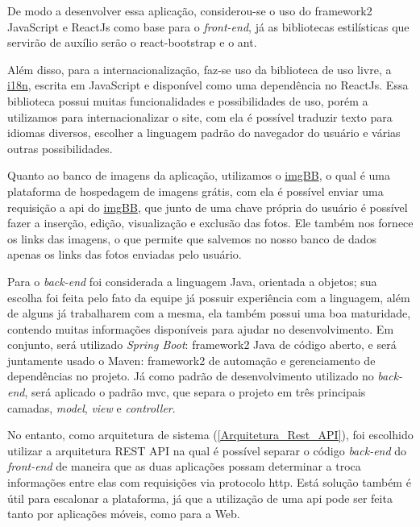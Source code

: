 De modo a desenvolver essa aplicação, considerou-se o uso do \gls{framework2} JavaScript e ReactJs como base para o \textsl{\gls{front-end}}, já as bibliotecas estilísticas que servirão de auxílio serão o \gls{react-bootstrap} e o \gls{ant}.

Além disso, para a internacionalização, faz-se uso da biblioteca de uso livre, a  \href{https://www.i18next.com}{i18n}, escrita em JavaScript e disponível como uma dependência no ReactJs. Essa biblioteca possui muitas funcionalidades e possibilidades de uso, porém a utilizamos para internacionalizar o site, com ela é possível traduzir texto para idiomas diversos, escolher a linguagem padrão do navegador do usuário e várias outras possibilidades.

Quanto ao banco de imagens da aplicação, utilizamos o \href{https://pt-br.imgbb.com}{imgBB}, o qual é uma plataforma de hospedagem de imagens grátis, com ela é possível enviar uma requisição a \acs{api} do \href{https://pt-br.imgbb.com}{imgBB}, que junto de uma chave própria do usuário é possível fazer a inserção, edição, visualização e exclusão das fotos. Ele também nos fornece os links das imagens, o que permite que salvemos no nosso banco de dados apenas os links das fotos enviadas pelo usuário.

Para o \textsl{\gls{back-end}} foi considerada a linguagem Java, orientada a objetos; sua escolha foi feita pelo fato da equipe já possuir experiência com a linguagem, além de alguns já trabalharem com a mesma, ela também possui uma boa maturidade, contendo muitas informações disponíveis para ajudar no desenvolvimento. Em conjunto, será utilizado \textit{Spring Boot}: \gls{framework2} Java de código aberto, e será juntamente usado o \gls{Maven}: \gls{framework2} de automação e gerenciamento de dependências no projeto.  Já como padrão de desenvolvimento utilizado no  \textsl{\gls{back-end}}, será aplicado o padrão \acs{mvc}, que separa o projeto em três principais camadas, \textit{model}, \textit{view} e \textit{controller}.

No entanto, como arquitetura de sistema (\autoref{Arquitetura_Rest_API}), foi escolhido utilizar a arquitetura \gls{REST API} na qual é possível separar o código \textsl{\gls{back-end}} do \textsl{\gls{front-end}} de maneira que as duas aplicações possam determinar a troca informações entre elas com requisições via protocolo \acs{http}. Está solução também é útil para escalonar a plataforma, já que a utilização de uma \acs{api} pode ser feita tanto por aplicações móveis, como para a Web.

